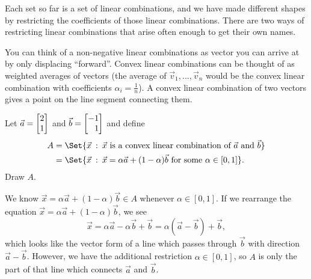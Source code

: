 Each set so far is a set of linear combinations, and we 
have made different shapes by restricting the coefficients of those linear
combinations. There are two ways of restricting linear combinations that arise
often enough to get their own names.


You can think of a non-negative linear combinations as vector you can arrive at by
only displacing ``forward''.
Convex linear combinations can be thought of as weighted averages of vectors (the average of $\vec v_1,\ldots,
\vec v_n$ would be the convex linear combination with coefficients $\alpha_i=\frac{1}{n}$). 
A convex linear combination
of two vectors gives a point on the line segment connecting them. 

\begin{example}
	Let $\vec a=\mat{2\\1}$ and $\vec b=\mat{-1\\1}$ and define
	\begin{align*}
		A&=\Set{\vec x\given \vec x\text{ is a convex linear combination of }\vec a\text{ and }\vec b}\\
		&=\Set{\vec x\given \vec x=\alpha\vec a+(1-\alpha)\vec b\text{ for some }\alpha\in [0,1]}.
	\end{align*}
	Draw $A$.

	We know $\vec x=\alpha\vec a+(1-\alpha)\vec b\in A$ whenever $\alpha\in[0,1]$. If we rearrange the
	equation $\vec x=\alpha\vec a+(1-\alpha)\vec b$, we see
	\[
		\vec x=\alpha\vec a-\alpha\vec b+\vec b = \alpha(\vec a-\vec b)+\vec b,
	\]
	which looks like the vector form of a line which passes through $\vec b$ with direction $\vec a-\vec b$.
	However, we have the additional restriction $\alpha\in[0,1]$, so $A$ is only the part of that line which connects $\vec a$
	and $\vec b$.


\end{example}
